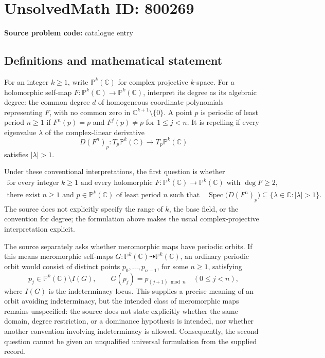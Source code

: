 \documentclass[11pt]{article}
\newcommand{\C}{\mathbb{C}}
\newcommand{\PP}{\mathbb{P}}
\begin{document}
\section*{UnsolvedMath ID: 800269}
\textbf{Source problem code:} catalogue entry
\subsection{Definitions and mathematical statement}
For an integer \(k\geq 1\), write \(\PP^k(\C)\) for complex projective \(k\)-space. For a holomorphic self-map \(F:\PP^k(\C)\to\PP^k(\C)\), interpret its degree as its algebraic degree: the common degree \(d\) of homogeneous coordinate polynomials representing \(F\), with no common zero in \(\C^{k+1}\setminus\{0\}\). A point \(p\) is periodic of least period \(n\geq 1\) if \(F^n(p)=p\) and \(F^j(p)\neq p\) for \(1\leq j<n\). It is repelling if every eigenvalue \(\lambda\) of the complex-linear derivative
\[
D(F^n)_p:T_p\PP^k(\C)\longrightarrow T_p\PP^k(\C)
\]
satisfies \(|\lambda|>1\).

Under these conventional interpretations, the first question is whether
\[
\begin{gathered}
\text{for every integer }k\geq 1\text{ and every holomorphic }F:\PP^k(\C)\to\PP^k(\C)\text{ with }\deg F\geq 2,\\
\text{there exist }n\geq 1\text{ and }p\in\PP^k(\C)\text{ of least period }n\text{ such that}
\quad
\operatorname{Spec}\bigl(D(F^n)_p\bigr)\subseteq\{\lambda\in\C:|\lambda|>1\}.
\end{gathered}
\]
The source does not explicitly specify the range of \(k\), the base field, or the convention for degree; the formulation above makes the usual complex-projective interpretation explicit.

The source separately asks whether meromorphic maps have periodic orbits. If this means meromorphic self-maps \(G:\PP^k(\C)\dashrightarrow\PP^k(\C)\), an ordinary periodic orbit would consist of distinct points \(p_0,\ldots,p_{n-1}\), for some \(n\geq 1\), satisfying
\[
p_j\in\PP^k(\C)\setminus I(G),\qquad
G(p_j)=p_{(j+1)\bmod n}\quad(0\leq j<n),
\]
where \(I(G)\) is the indeterminacy locus. This supplies a precise meaning of an orbit avoiding indeterminacy, but the intended class of meromorphic maps remains unspecified: the source does not state explicitly whether the same domain, degree restriction, or a dominance hypothesis is intended, nor whether another convention involving indeterminacy is allowed. Consequently, the second question cannot be given an unqualified universal formulation from the supplied record.
\end{document}
